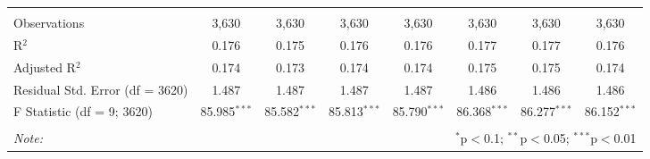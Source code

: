 \begin{table}[!htbp]
\begin{tabular}{@{\extracolsep{5pt}}lccccccc}
  & & & & & & & \\ 
\hline \\[-1.8ex] 
Observations & 3,630 & 3,630 & 3,630 & 3,630 & 3,630 & 3,630 & 3,630 \\ 
R$^{2}$ & 0.176 & 0.175 & 0.176 & 0.176 & 0.177 & 0.177 & 0.176 \\ 
Adjusted R$^{2}$ & 0.174 & 0.173 & 0.174 & 0.174 & 0.175 & 0.175 & 0.174 \\ 
Residual Std. Error (df = 3620) & 1.487 & 1.487 & 1.487 & 1.487 & 1.486 & 1.486 & 1.486 \\ 
F Statistic (df = 9; 3620) & 85.985$^{***}$ & 85.582$^{***}$ & 85.813$^{***}$ & 85.790$^{***}$ & 86.368$^{***}$ & 86.277$^{***}$ & 86.152$^{***}$ \\ 
\hline 
\hline \\[-1.8ex] 
\textit{Note:}  & \multicolumn{7}{r}{$^{*}$p$<$0.1; $^{**}$p$<$0.05; $^{***}$p$<$0.01} \\ 
\end{tabular} 
\end{table} 

